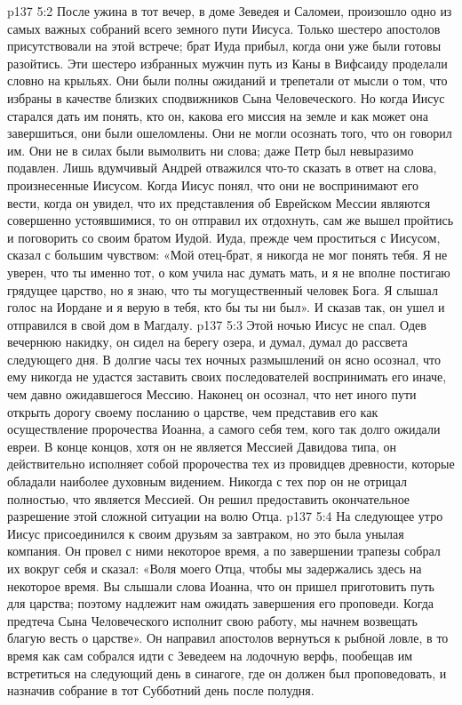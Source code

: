 \vs p137 5:2 После ужина в тот вечер, в доме Зеведея и Саломеи, произошло одно из самых важных собраний всего земного пути Иисуса. Только шестеро апостолов присутствовали на этой встрече; брат Иуда прибыл, когда они уже были готовы разойтись. Эти шестеро избранных мужчин путь из Каны в Вифсаиду проделали словно на крыльях. Они были полны ожиданий и трепетали от мысли о том, что избраны в качестве близких сподвижников Сына Человеческого. Но когда Иисус старался дать им понять, кто он, какова его миссия на земле и как может она завершиться, они были ошеломлены. Они не могли осознать того, что он говорил им. Они не в силах были вымолвить ни слова; даже Петр был невыразимо подавлен. Лишь вдумчивый Андрей отважился что\hyp{}то сказать в ответ на слова, произнесенные Иисусом. Когда Иисус понял, что они не воспринимают его вести, когда он увидел, что их представления об Еврейском Мессии являются совершенно устоявшимися, то он отправил их отдохнуть, сам же вышел пройтись и поговорить со своим братом Иудой. Иуда, прежде чем проститься с Иисусом, сказал с большим чувством: «Мой отец\hyp{}брат, я никогда не мог понять тебя. Я не уверен, что ты именно тот, о ком учила нас думать мать, и я не вполне постигаю грядущее царство, но я знаю, что ты могущественный человек Бога. Я слышал голос на Иордане и я верую в тебя, кто бы ты ни был». И сказав так, он ушел и отправился в свой дом в Магдалу.
\vs p137 5:3 Этой ночью Иисус не спал. Одев вечернюю накидку, он сидел на берегу озера, и думал, думал до рассвета следующего дня. В долгие часы тех ночных размышлений он ясно осознал, что ему никогда не удастся заставить своих последователей воспринимать его иначе, чем давно ожидавшегося Мессию. Наконец он осознал, что нет иного пути открыть дорогу своему посланию о царстве, чем представив его как осуществление пророчества Иоанна, а самого себя тем, кого так долго ожидали евреи. В конце концов, хотя он не является Мессией Давидова типа, он действительно исполняет собой пророчества тех из провидцев древности, которые обладали наиболее духовным видением. Никогда с тех пор он не отрицал полностью, что является Мессией. Он решил предоставить окончательное разрешение этой сложной ситуации на волю Отца.
\vs p137 5:4 На следующее утро Иисус присоединился к своим друзьям за завтраком, но это была унылая компания. Он провел с ними некоторое время, а по завершении трапезы собрал их вокруг себя и сказал: «Воля моего Отца, чтобы мы задержались здесь на некоторое время. Вы слышали слова Иоанна, что он пришел приготовить путь для царства; поэтому надлежит нам ожидать завершения его проповеди. Когда предтеча Сына Человеческого исполнит свою работу, мы начнем возвещать благую весть о царстве». Он направил апостолов вернуться к рыбной ловле, в то время как сам собрался идти с Зеведеем на лодочную верфь, пообещав им встретиться на следующий день в синагоге, где он должен был проповедовать, и назначив собрание в тот Субботний день после полудня.
